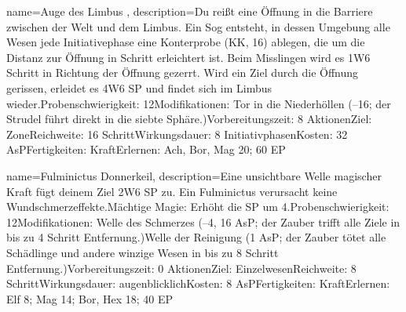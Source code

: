 {
    name={Auge des Limbus },
    description={Du reißt eine Öffnung in die Barriere zwischen der Welt und dem Limbus. Ein Sog entsteht, in dessen Umgebung alle Wesen jede Initiativephase eine Konterprobe (KK, 16) ablegen, die um die Distanz zur Öffnung in Schritt erleichtert ist. Beim Misslingen wird es 1W6 Schritt in Richtung der Öffnung gezerrt. Wird ein Ziel durch die Öffnung gerissen, erleidet es 4W6 SP und findet sich im Limbus wieder.\newline Probenschwierigkeit: 12\newline Modifikationen: Tor in die Niederhöllen (–16; der Strudel führt direkt in die siebte Sphäre.)\newline Vorbereitungszeit: 8 Aktionen\newline Ziel: Zone\newline Reichweite: 16 Schritt\newline Wirkungsdauer: 8 Initiativphasen\newline Kosten: 32 AsP\newline Fertigkeiten: Kraft\newline Erlernen: Ach, Bor, Mag 20; 60 EP}
}


{
    name={Fulminictus Donnerkeil},
    description={Eine unsichtbare Welle magischer Kraft fügt deinem Ziel 2W6 SP zu. Ein Fulminictus verursacht keine Wundschmerzeffekte.\newline Mächtige Magie: Erhöht die SP um 4.\newline Probenschwierigkeit: 12\newline Modifikationen: Welle des Schmerzes (–4, 16 AsP; der Zauber trifft alle Ziele in bis zu 4 Schritt Entfernung.)\newline Welle der Reinigung (1 AsP; der Zauber tötet alle Schädlinge und andere winzige Wesen in bis zu 8 Schritt Entfernung.)\newline Vorbereitungszeit: 0 Aktionen\newline Ziel: Einzelwesen\newline Reichweite: 8 Schritt\newline Wirkungsdauer: augenblicklich\newline Kosten: 8 AsP\newline Fertigkeiten: Kraft\newline Erlernen: Elf 8; Mag 14; Bor, Hex 18; 40 EP}
}



